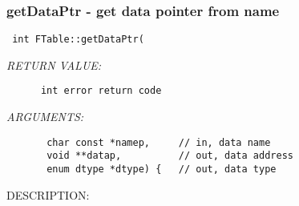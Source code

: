  
\setlength{\oldparskip}{\parskip}
\setlength{\parskip}{1.5ex}
\setlength{\oldparindent}{\parindent}
\setlength{\parindent}{0pt}
\setlength{\oldbaselineskip}{\baselineskip}
\setlength{\baselineskip}{11pt}
 
\def\bv{\begin{verbatim}}
\def\ev{\end{verbatim}}
\def\be{\begin{equation}}
\def\ee{\end{equation}}
\def\bea{\begin{eqnarray}}
\def\eea{\end{eqnarray}}
\def\bi{\begin{itemize}}
\def\ei{\end{itemize}}
\def\bn{\begin{enumerate}}
\def\en{\end{enumerate}}
\def\bd{\begin{description}}
\def\ed{\end{description}}
\def\({\left (}
\def\){\right )}
\def\[{\left [}
\def\]{\right ]}
\def\<{\left  \langle}
\def\>{\right \rangle}
\def\cI{{\cal I}}
\def\diag{\mathop{\rm diag}}
\def\tr{\mathop{\rm tr}}


 
\subsubsection [getDataPtr] {getDataPtr - get data pointer from name}


  
\begin{verbatim} int FTable::getDataPtr(\end{verbatim}{\em RETURN VALUE:}
\begin{verbatim}      int error return code\end{verbatim}{\em ARGUMENTS:}
\begin{verbatim}       char const *namep,     // in, data name
       void **datap,          // out, data address
       enum dtype *dtype) {   // out, data type\end{verbatim}
{\sf DESCRIPTION:\\ }


